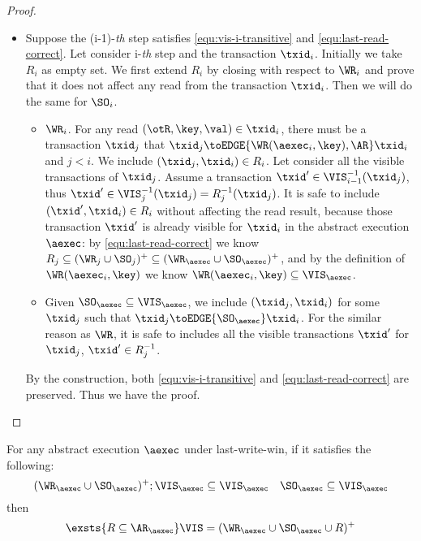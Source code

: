 \begin{proof}
\begin{itemize}
    \item {}
    Suppose the (i-1)-\emph{th} step satisfies \cref{equ:vis-i-transitive} and \cref{equ:last-read-correct}.
    Let consider i-\emph{th} step and the transaction \( \txid_i \).
    Initially we take \( R_i \) as empty set.
    We first extend \( R_i \) by closing with respect to \( \WR_i \)
    and prove that it does not affect any read from the transaction \( \txid_i \).
    Then we will do the same for \( \SO_i \).
    \begin{itemize}
        \item \( \WR_i\). For any read \( (\otR, \key, \val ) \in \txid_i \),
        there must be a transaction \( \txid_j \) that \( \txid_j \toEDGE{\WR(\aexec_i,\key), \AR} \txid_i \) and \( j < i \).
        We include \( (\txid_j, \txid_i) \in R_i \).
        Let consider all the visible transactions of \( \txid_j \).
        Assume a transaction \( \txid' \in \VIS_{i-1}^{-1}(\txid_j) \), 
        thus \( \txid' \in \VIS_{j}^{-1}(\txid_j) = R_j^{-1}(\txid_j) \).
        It is safe to include \( (\txid', \txid_i) \in R_i \) without affecting the read result,
        because those transaction \( \txid' \) is already visible for \( \txid_i \) in the abstract execution \( \aexec \):
        by \cref{equ:last-read-correct} we know \( R_j \subseteq (\WR_j \cup \SO_j)^{+} \subseteq (\WR_\aexec \cup \SO_\aexec)^{+}\),
        and by the definition of \( \WR(\aexec_i,\key) \) we know \( \WR(\aexec_i,\key) \subseteq \VIS_\aexec\).

        \item Given \( \SO_\aexec \subseteq \VIS_\aexec \), we include \( (\txid_j,\txid_i) \) for some \( \txid_j \)
        such that \( \txid_j \toEDGE{\SO_\aexec} \txid_i\).
        For the similar reason as \( \WR \),
        it is safe to includes all the visible transactions \( \txid' \) for \( \txid_j \), \ie \( \txid' \in R_j^{-1}\).
        \end{itemize}
        
    By the construction, both \cref{equ:vis-i-transitive} and \cref{equ:last-read-correct} are preserved. 
    Thus we have the proof.
    \end{itemize}
\end{proof}
\begin{proposition}
    \label{prop:cc-vis}
    For any abstract execution \( \aexec \) under last-write-win, if it satisfies the following:
    \[
        (\WR_\aexec \cup \SO_\aexec)^{+} ; \VIS_\aexec \subseteq \VIS_\aexec \quad \SO_\aexec \subseteq \VIS_\aexec
    \]
    then
    \[
        \exsts{R \subseteq \AR_\aexec} \VIS = (\WR_\aexec \cup \SO_\aexec \cup R)^{+}
    \]
\end{proposition}

